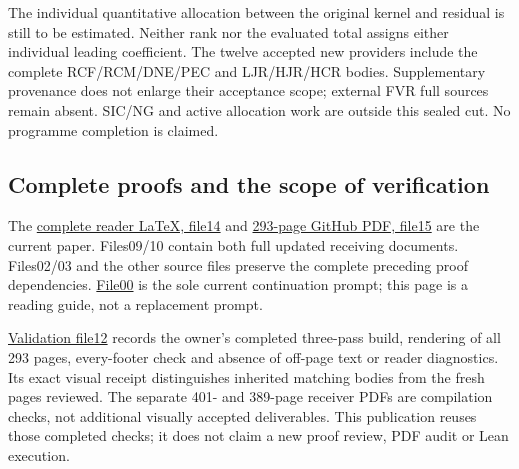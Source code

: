 \documentclass[
]{article}
\begin{document}
The individual quantitative allocation between the original kernel and
residual is still to be estimated. Neither rank nor the evaluated total
assigns either individual leading coefficient. The twelve accepted new
providers include the complete RCF/RCM/DNE/PEC and LJR/HJR/HCR bodies.
Supplementary provenance does not enlarge their acceptance scope;
external FVR full sources remain absent. SIC/NG and active allocation
work are outside this sealed cut. No programme completion is claimed.

\subsection{Complete proofs and the scope of
verification}\label{complete-proofs-and-the-scope-of-verification}

The
\href{https://github.com/KokunoYumeto/zeta-function-research-reader/blob/b4076eb15afd6b036a8de62d67b88eef03efeb50/workbenches/splitzero-tandem/continuations/20260915-dual-metric-continuation/14_CURRENT_KERNEL_AND_MULTIPLICITY_PROOFS.tex}{complete
reader LaTeX, file14} and
\href{https://github.com/KokunoYumeto/zeta-function-research-reader/blob/b4076eb15afd6b036a8de62d67b88eef03efeb50/workbenches/splitzero-tandem/continuations/20260915-dual-metric-continuation/15_CURRENT_MIXED_CONTROL_READER.pdf}{293-page
GitHub PDF, file15} are the current paper. Files09/10 contain both full
updated receiving documents. Files02/03 and the other source files
preserve the complete preceding proof dependencies.
\href{https://github.com/KokunoYumeto/zeta-function-research-reader/blob/b4076eb15afd6b036a8de62d67b88eef03efeb50/workbenches/splitzero-tandem/continuations/20260915-dual-metric-continuation/00_CONTINUE_HERE.md}{File00}
is the sole current continuation prompt; this page is a reading guide,
not a replacement prompt.

\href{https://github.com/KokunoYumeto/zeta-function-research-reader/blob/b4076eb15afd6b036a8de62d67b88eef03efeb50/workbenches/splitzero-tandem/continuations/20260915-dual-metric-continuation/12_VALIDATION.md}{Validation
file12} records the owner's completed three-pass build, rendering of all
293 pages, every-footer check and absence of off-page text or reader
diagnostics. Its exact visual receipt distinguishes inherited matching
bodies from the fresh pages reviewed. The separate 401- and 389-page
receiver PDFs are compilation checks, not additional visually accepted
deliverables. This publication reuses those completed checks; it does
not claim a new proof review, PDF audit or Lean execution.
\end{document}
